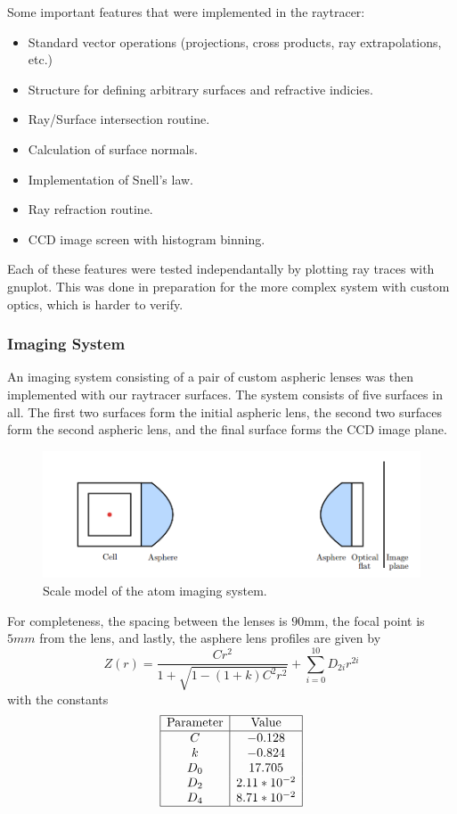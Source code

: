 Some important features that were implemented in the raytracer:
\begin{itemize}
\item Standard vector operations (projections, cross products, ray extrapolations, etc.)
\item Structure for defining arbitrary surfaces and refractive indicies.
\item Ray/Surface intersection routine.
\item Calculation of surface normals.
\item Implementation of Snell's law.
\item Ray refraction routine.
\item CCD image screen with histogram binning.
\end{itemize}
Each of these features were tested independantally by plotting ray traces with gnuplot. This was done in preparation for the more complex system with custom optics, which is harder to verify.

\subsubsection{Imaging System}
An imaging system consisting of a pair of custom aspheric lenses was then implemented with our raytracer surfaces. The system consists of five surfaces in all. The first two surfaces form the initial aspheric lens, the second two surfaces form the second aspheric lens, and the final surface forms the CCD image plane.

\begin{figure}
\includegraphics[scale=0.5]{asphere.png}
\caption{Scale model of the atom imaging system.}
\end{figure}

For completeness, the spacing between the lenses is $90$mm, the focal point is $5mm$ from the lens, and lastly, the asphere lens profiles are given by
\begin{equation}
  Z(r) = \frac{ C r^2}{1 + \sqrt{1-(1+k)C^2r^2}} + \sum_{i=0}^{10}D_{2i}r^{2i}
\end{equation}
with the constants
\begin{equation}
\begin{array}{|c|c|}
\hline
\text{Parameter} & \text{Value} \\
\hline
C & -0.128 \\
k & -0.824 \\ 
D_0 & 17.705 \\
D_2 & 2.11*10^{-2} \\
D_4 & 8.71*10^{-2} \\
\hline
\end{array}
\end{equation}



